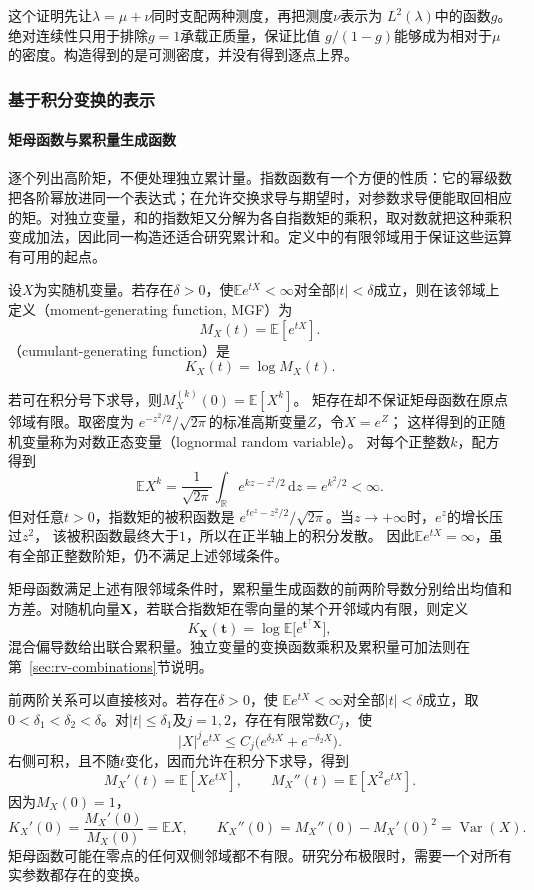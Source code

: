 这个证明先让\(\lambda=\mu+\nu\)同时支配两种测度，再把测度\(\nu\)表示为
\(L^2(\lambda)\)中的函数\(g\)。绝对连续性只用于排除\(g=1\)承载正质量，保证比值
\(g/(1-g)\)能够成为相对于\(\mu\)的密度。构造得到的是可测密度，并没有得到逐点上界。

\subsubsection{基于积分变换的表示}
\label{sec:probability-moment-transforms}
\paragraph{矩母函数与累积量生成函数}
逐个列出高阶矩，不便处理独立累计量。指数函数有一个方便的性质：它的幂级数把各阶幂放进同一个表达式；在允许交换求导与期望时，对参数求导便能取回相应的矩。对独立变量，和的指数矩又分解为各自指数矩的乘积，取对数就把这种乘积变成加法，因此同一构造还适合研究累计和。定义中的有限邻域用于保证这些运算有可用的起点。
\begin{definition}[矩母函数与累积量生成函数]
  \label{def:probability-moment-generating-functions}
设\(X\)为实随机变量。若存在\(\delta>0\)，使\(\mathbb E e^{tX}<\infty\)对全部\(|t|<\delta\)成立，则在该邻域上定义（moment-generating function, MGF）为
\[ M_X(t)=\mathbb{E}[e^{tX}]. \]
（cumulant-generating function）是
\[ K_X(t)=\log M_X(t). \]
\end{definition}
若可在积分号下求导，则\(M_X^{(k)}(0)=\mathbb{E}[X^k]\)。
矩存在却不保证矩母函数在原点邻域有限。取密度为
\(e^{-z^2/2}/\sqrt{2\pi}\)的标准高斯变量\(Z\)，令\(X=e^Z\)；
这样得到的正随机变量称为对数正态变量（lognormal random variable）。
对每个正整数\(k\)，配方得到
\[
 \mathbb E X^k
 =\frac1{\sqrt{2\pi}}\int_{\mathbb R}e^{kz-z^2/2}\,\mathrm dz
 =e^{k^2/2}<\infty.
\]
但对任意\(t>0\)，指数矩的被积函数是
\(e^{te^z-z^2/2}/\sqrt{2\pi}\)。当\(z\to+\infty\)时，\(e^z\)的增长压过\(z^2\)，
该被积函数最终大于\(1\)，所以在正半轴上的积分发散。
因此\(\mathbb E e^{tX}=\infty\)，虽有全部正整数阶矩，仍不满足上述邻域条件。

矩母函数满足上述有限邻域条件时，累积量生成函数的前两阶导数分别给出均值和方差。对随机向量\(\bm{X}\)，若联合指数矩在零向量的某个开邻域内有限，则定义
\[ K_{\bm{X}}(\bm{t})
  =\log\mathbb{E}\bigl[e^{\bm{t}^{\top}\bm{X}}\bigr], \]
混合偏导数给出联合累积量。独立变量的变换函数乘积及累积量可加法则在第~\ref{sec:rv-combinations}节说明。

前两阶关系可以直接核对。若存在\(\delta>0\)，使
\(\mathbb E e^{tX}<\infty\)对全部\(|t|<\delta\)成立，取\(0<\delta_1<\delta_2<\delta\)。对\(|t|\leq\delta_1\)及\(j=1,2\)，存在有限常数\(C_j\)，使
\[ |X|^j e^{tX}\leq C_j\bigl(e^{\delta_2X}+e^{-\delta_2X}\bigr). \]
右侧可积，且不随\(t\)变化，因而允许在积分下求导，得到
\[
  M_X'(t)=\mathbb{E}[Xe^{tX}],\qquad
  M_X''(t)=\mathbb{E}[X^2e^{tX}].
\]
因为\(M_X(0)=1\)，
\[
  K_X'(0)=\frac{M_X'(0)}{M_X(0)}=\mathbb{E}X,
  \qquad
  K_X''(0)
  =M_X''(0)-M_X'(0)^2
  =\operatorname{Var}(X).
\]
矩母函数可能在零点的任何双侧邻域都不有限。研究分布极限时，需要一个对所有实参数都存在的变换。
